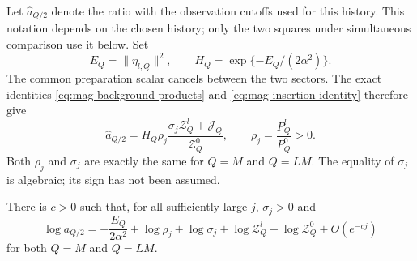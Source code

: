 Let $\widehat a_{Q/2}$ denote the ratio with the observation cutoffs
used for this history.  This notation depends on the chosen history;
only the two squares under simultaneous comparison use it below.
Set
\[
 E_Q=\|\eta_{l,Q}\|^2,
 \qquad H_Q=\exp\{-E_Q/(2\alpha^2)\}.
\]
The common preparation scalar cancels between the two sectors.  The
exact identities \eqref{eq:mag-background-products} and
\eqref{eq:mag-insertion-identity} therefore give
\begin{equation}
 \widehat a_{Q/2}
 =H_Q\rho_j
       \frac{\sigma_j\mathcal Z_Q^l+\mathcal J_Q}
            {\mathcal Z_Q^0},
 \qquad
 \rho_j=\frac{P_Q^l}{P_Q^0}>0.
 \label{eq:terminal-exact-ratio}
\end{equation}
Both $\rho_j$ and $\sigma_j$ are exactly the same for $Q=M$ and $Q=LM$.
The equality of $\sigma_j$ is algebraic; its sign has not been assumed.

\begin{lemma}
\label{lem:terminal-scalar}
There is $c>0$ such that, for all sufficiently large $j$,
$\sigma_j>0$ and
\begin{equation}
 \log a_{Q/2}
 =-\frac{E_Q}{2\alpha^2}+\log\rho_j+\log\sigma_j
    +\log\mathcal Z_Q^l-\log\mathcal Z_Q^0+O(e^{-cj})
 \label{eq:terminal-log-ratio}
\end{equation}
for both $Q=M$ and $Q=LM$.
\end{lemma}

